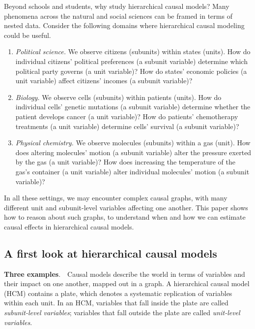 \documentclass[12pt]{article}
\newcommand{\parhead}[1]{\vspace{0.1in} \noindent \textbf{#1}. \,\,}
\begin{document}
Beyond schools and students, why study hierarchical causal models?
Many phenomena across the natural and social sciences can be framed in
terms of nested data. Consider the following domains where
hierarchical causal modeling could be useful.
\begin{enumerate}[leftmargin=*]
\item \textit{Political science.} We observe citizens (subunits) within states (units). How do individual citizens' political preferences (a subunit variable) determine which political party governs (a unit variable)? How do states' economic policies (a unit variable) affect citizens' incomes (a subunit variable)?

\item \textit{Biology.} We observe cells (subunits) within patients (units).  How do individual cells' genetic mutations (a subunit variable) determine whether the patient develops cancer (a unit variable)? How do patients' chemotherapy treatments (a unit variable) determine cells' survival (a subunit variable)?

\item \textit{Physical chemistry.} We observe molecules (subunits) within a gas (unit).  How does altering molecules' motion (a subunit variable) alter the pressure exerted by the gas (a unit variable)? How does increasing the temperature of the gas's container (a unit variable) alter individual molecules' motion (a subunit variable)?

\end{enumerate}
In all these settings, we may encounter complex causal graphs, with many different unit and subunit-level variables affecting one another. This paper shows how to reason about such graphs, to understand when and how we can estimate causal effects in hierarchical causal models.









\subsection{A first look at hierarchical causal models} \label{sec:first_look}
\parhead{Three examples} Causal models describe the world in
terms of variables and their impact on one another, mapped out in a
graph. A hierarchical causal model (HCM) contains a plate,
which denotes a systematic replication of variables within each unit.
In an HCM, variables that fall inside the plate are called
\textit{subunit-level variables}; variables that fall outside the
plate are called \textit{unit-level variables}.
\end{document}
